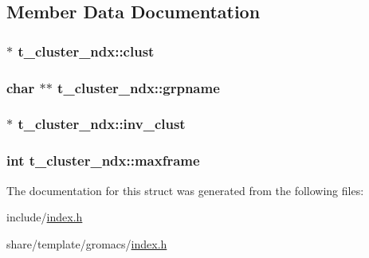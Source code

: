 \subsection{\-Member \-Data \-Documentation}
\hypertarget{structt__cluster__ndx_a44e66e1ebe8101eca9f418ffee09ccf0}{
\subsubsection[{clust}]{ $\ast$ {\bf t\-\_\-cluster\-\_\-ndx\-::clust}}}\label{structt__cluster__ndx_a44e66e1ebe8101eca9f418ffee09ccf0}
\hypertarget{structt__cluster__ndx_ada6eb70e13ea87c0a836bc3a89949fc3}{
\subsubsection[{grpname}]{\setlength{\rightskip}{0pt plus 5cm}char $\ast$$\ast$ {\bf t\-\_\-cluster\-\_\-ndx\-::grpname}}}\label{structt__cluster__ndx_ada6eb70e13ea87c0a836bc3a89949fc3}
\hypertarget{structt__cluster__ndx_a7edcd7772ffba5859ca0db4f2216342a}{
\subsubsection[{inv\-\_\-clust}]{ $\ast$ {\bf t\-\_\-cluster\-\_\-ndx\-::inv\-\_\-clust}}}\label{structt__cluster__ndx_a7edcd7772ffba5859ca0db4f2216342a}
\hypertarget{structt__cluster__ndx_a7a40234513dfbd54fd6666c8a6fa9278}{
\subsubsection[{maxframe}]{\setlength{\rightskip}{0pt plus 5cm}int {\bf t\-\_\-cluster\-\_\-ndx\-::maxframe}}}\label{structt__cluster__ndx_a7a40234513dfbd54fd6666c8a6fa9278}


\-The documentation for this struct was generated from the following files\-:\begin{DoxyCompactItemize}
\item 
include/\hyperlink{include_2index_8h}{index.\-h}\item 
share/template/gromacs/\hyperlink{share_2template_2gromacs_2index_8h}{index.\-h}\end{DoxyCompactItemize}

